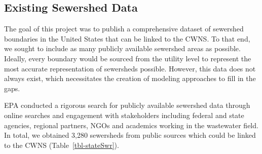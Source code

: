 \documentclass[
  letterpaper,
  DIV=11,
  numbers=noendperiod]{scrartcl}
\begin{document}
\subsection{Existing Sewershed Data}\label{existing-sewershed-data}

The goal of this project was to publish a comprehensive dataset of
sewershed boundaries in the United States that can be linked to the
CWNS. To that end, we sought to include as many publicly available
sewershed areas as possible. Ideally, every boundary would be sourced
from the utility level to represent the most accurate representation of
sewersheds possible. However, this data does not always exist, which
necessitates the creation of modeling approaches to fill in the gaps.

EPA conducted a rigorous search for publicly available sewershed data
through online searches and engagement with stakeholders including
federal and state agencies, regional partners, NGOs and academics
working in the wastewater field. In total, we obtained 3,280 sewersheds
from public sources which could be linked to the CWNS
(Table~\ref{tbl-stateSwr}).
\end{document}
